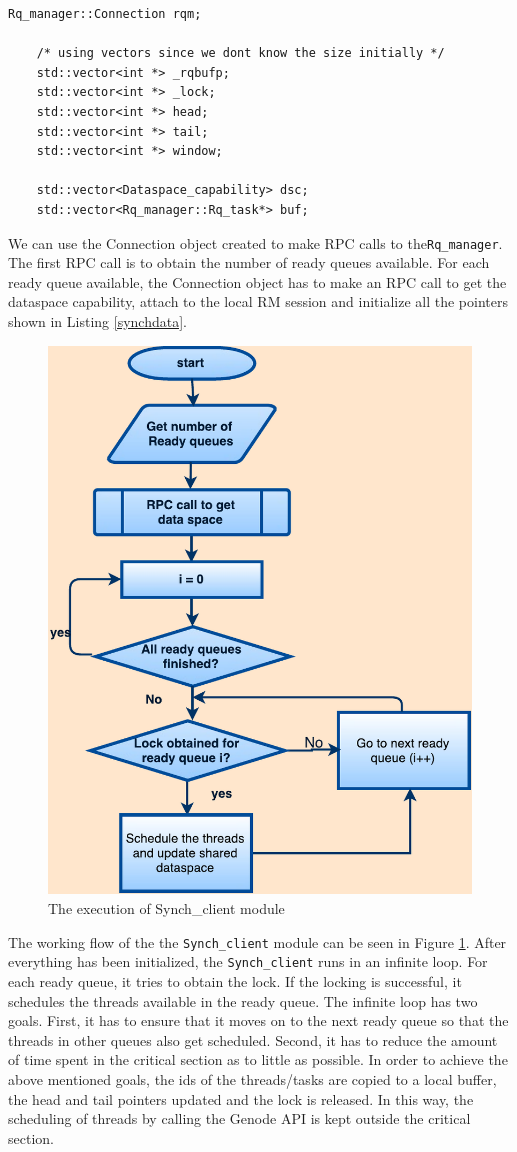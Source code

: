 \begin{lstlisting}[caption={Data structures used in Synch\_client},label={synchdata}, style=customcpp]
	Rq_manager::Connection rqm;
	
	/* using vectors since we dont know the size initially */
	std::vector<int *> _rqbufp;
	std::vector<int *> _lock;
	std::vector<int *> head; 
	std::vector<int *> tail; 
	std::vector<int *> window;
	
	std::vector<Dataspace_capability> dsc;
	std::vector<Rq_manager::Rq_task*> buf;
\end{lstlisting}

We can use the Connection object created to make RPC calls to the\texttt{Rq\_manager}. The first RPC call is to obtain the number of ready queues available. For each ready queue available, the Connection object has to make an RPC call to get the dataspace capability, attach to the local RM session and initialize all the pointers shown in Listing \ref{synchdata}. 

\begin{figure}[h]
\centering
\includegraphics[width=0.5\linewidth]{figures/flow}
\caption{The execution of Synch\_client module}
\label{fig:flow}
\end{figure}

The working flow of the the \texttt{Synch\_client} module can be seen in Figure \ref{fig:flow}. After everything has been initialized, the \texttt{Synch\_client} runs in an infinite loop. For each ready queue, it tries to obtain the lock. If the locking is successful, it schedules the threads available in the ready queue. The infinite loop has two goals. First, it has to ensure that it moves on to the next ready queue so that the threads in other queues also get scheduled. Second, it has to reduce the amount of time spent in the critical section as to little as possible. In order to achieve the above mentioned goals, the ids of the threads/tasks are copied to a local buffer, the head and tail pointers updated and the lock is released. In this way, the scheduling of threads by calling the Genode API is kept outside the critical section.

